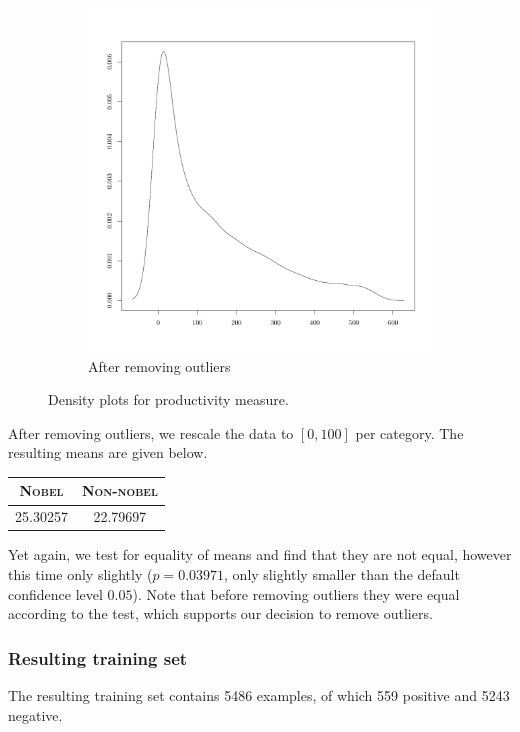\begin{figure}
\begin{subfigure}[b]{0.3\textwidth}
        \includegraphics[width=\textwidth]{figures/prodNoOutDensity.pdf}
        \caption{After removing outliers}
        \label{fig:prodNoOutDensity}
    \end{subfigure}
    \caption{Density plots for productivity measure.}
    \label{fig:productivity}
\end{figure}

After removing outliers, we rescale the data to $[0, 100]$ per category. The resulting means are given below.
\begin{table}[H]
\centering
\begin{tabular}{c|c}
\textbf{\textsc{Nobel}} & \textbf{\textsc{Non-nobel}} \\ \hline
\rule{0pt}{4mm}25.30257&22.79697 \\
\end{tabular}
\end{table}
\noindent Yet again, we test for equality of means and find that they are not equal, however this time only slightly ($p = 0.03971$, only slightly smaller than the default confidence level $0.05$). Note that before removing outliers they were equal according to the test, which supports our decision to remove outliers.

\subsubsection{Resulting training set}
The resulting training set contains 5486 examples, of which 559 positive and 5243 negative.


